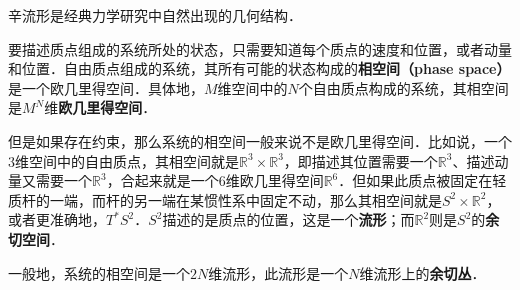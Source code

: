 
辛流形是经典力学研究中自然出现的几何结构．

要描述质点组成的系统所处的状态，只需要知道每个质点的速度和位置，或者动量和位置．自由质点组成的系统，其所有可能的状态构成的\textbf{相空间（phase space）}是一个欧几里得空间．具体地，$M$维空间中的$N$个自由质点构成的系统，其相空间是$M^N$维\textbf{欧几里得空间}．

但是如果存在约束，那么系统的相空间一般来说不是欧几里得空间．比如说，一个$3$维空间中的自由质点，其相空间就是$\mathbb{R}^3\times \mathbb{R}^3$，即描述其位置需要一个$\mathbb{R}^3$、描述动量又需要一个$\mathbb{R}^3$，合起来就是一个$6$维欧几里得空间$\mathbb{R}^6$．但如果此质点被固定在轻质杆的一端，而杆的另一端在某惯性系中固定不动，那么其相空间就是$S^2\times \mathbb{R}^2$，或者更准确地，$T^* S^2$．$S^2$描述的是质点的位置，这是一个\textbf{流形}；而$\mathbb{R}^2$则是$S^2$的\textbf{余切空间}．

一般地，系统的相空间是一个$2N$维流形，此流形是一个$N$维流形上的\textbf{余切丛}．





























